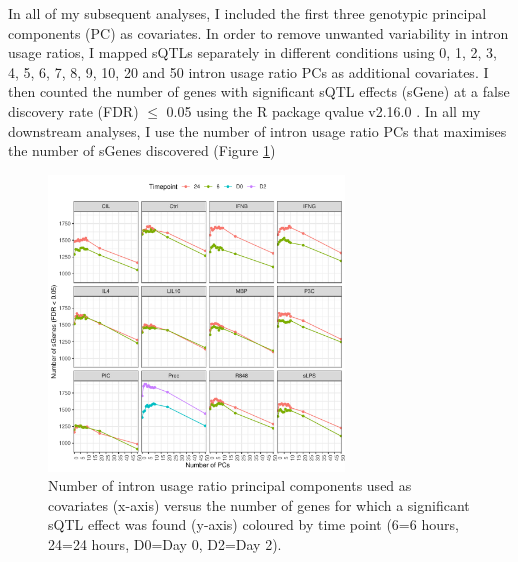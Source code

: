 In all of my subsequent analyses, I included the first three genotypic principal components (PC) as covariates. In order to remove unwanted variability in intron usage ratios, I mapped sQTLs separately in different conditions using 0, 1, 2, 3, 4, 5, 6, 7, 8, 9, 10, 20 and 50  intron usage ratio PCs as additional covariates. I then counted the number of genes with significant sQTL effects (sGene) at a false discovery rate (FDR) $\leq$ 0.05 using the R package qvalue v2.16.0 \cite{Storey2003-zd}. In all my downstream analyses, I use the number of intron usage ratio PCs that maximises the number of sGenes discovered (Figure \ref{fig:num_sgenes_PCs})

\begin{figure}[H]
  \centering
  \includegraphics[width=0.7\textwidth]{num_sgenes_PCs}
  \caption[Number of principal components used in sQTL mapping and number of discovered sGenes]{Number of intron usage ratio principal components used as
  covariates (x-axis) versus the number of genes for which a significant sQTL effect was found
  (y-axis) coloured by time point (6=6 hours, 24=24 hours, D0=Day 0, D2=Day 2).}
  \label{fig:num_sgenes_PCs}   
\end{figure}




